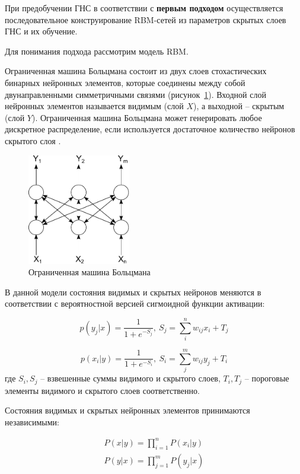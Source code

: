 При предобучении ГНС в соответствии с \textbf{первым подходом} осуществляется последовательное конструирование RBM-сетей из параметров скрытых слоев ГНС и их обучение. 

Для понимания подхода рассмотрим модель RBM.

Ограниченная машина Больцмана состоит из двух слоев стохастических бинарных нейронных элементов, которые соединены между собой двунаправленными симметричными связями (рисунок~\ref{fig:pic1_3}). Входной слой нейронных элементов называется видимым (слой $X$), а выходной -- скрытым (слой $Y$). Ограниченная машина Больцмана может генерировать любое дискретное распределение, если используется достаточное количество нейронов скрытого слоя \cite{n5}.

\begin{figure}[H]
  \centering
  \includegraphics[width=0.4\textwidth]{man-source/images/ch1/pic1-3.pdf}
  \caption{Ограниченная машина Больцмана}
  \label{fig:pic1_3}
\end{figure}	

В данной модели состояния видимых и скрытых нейронов меняются в соответствии с вероятностной версией сигмоидной функции активации:
	
\begin{equation}
	p(y_j\lvert x)=\frac{1}{1+e^{-S_j}},\ S_j=\sum_i^n w_{ij}x_i+T_j
\end{equation}
	
\begin{equation}
	p(x_i\lvert y)=\frac{1}{1+e^{-S_i}},\ S_i=\sum_j^m w_{ij}y_j+T_i
\end{equation}
где $S_i, S_j$ -- взвешенные суммы видимого и скрытого слоев, $T_i, T_j$ -- пороговые элементы видимого и скрытого слоев соответственно.
	
Состояния видимых и скрытых нейронных элементов принимаются независимыми:
	
\begin{equation*}
\begin{aligned}
	P(x \lvert y) = \prod_{i=1}^n P(x_i \lvert y)\\
	P(y \lvert x) = \prod_{j=1}^m P(y_j \lvert x)
\end{aligned}	
\end{equation*}
	
